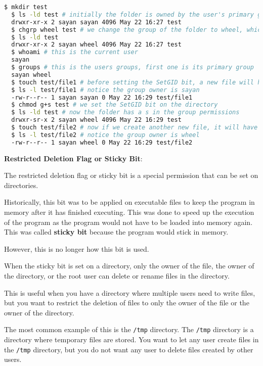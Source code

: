 \begin{lstlisting}[language=bash]
  $ mkdir test
  $ ls -ld test # initially the folder is owned by the user's primary group
  drwxr-xr-x 2 sayan sayan 4096 May 22 16:27 test
  $ chgrp wheel test # we change the group of the folder to wheel, which is a group that the user is part of
  $ ls -ld test
  drwxr-xr-x 2 sayan wheel 4096 May 22 16:27 test
  $ whoami # this is the current user
  sayan
  $ groups # this is the users groups, first one is its primary group
  sayan wheel
  $ touch test/file1 # before setting the SetGID bit, a new file will have group owner as the primary group of the user creating it
  $ ls -l test/file1 # notice the group owner is sayan
  -rw-r--r-- 1 sayan sayan 0 May 22 16:29 test/file1
  $ chmod g+s test # we set the SetGID bit on the directory
  $ ls -ld test # now the folder has a s in the group permissions
  drwxr-sr-x 2 sayan wheel 4096 May 22 16:29 test
  $ touch test/file2 # now if we create another new file, it will have the group owner as the group of the directory
  $ ls -l test/file2 # notice the group owner is wheel
  -rw-r--r-- 1 sayan wheel 0 May 22 16:29 test/file2
\end{lstlisting}

\textbf{Restricted Deletion Flag or Sticky Bit}:

The restricted deletion flag or sticky bit is a special permission that can be set on directories.

Historically, this bit was to be applied on executable files to keep the program in memory after it has finished executing.
This was done to speed up the execution of the program as the program would not have to be loaded into memory again.
This was called \textbf{sticky bit} because the program would stick in memory.

However, this is no longer how this bit is used.

When the sticky bit is set on a directory, only the owner of the file, the owner of the directory, or the root user can delete or rename files in the directory.

This is useful when you have a directory where multiple users need to write files, but you want to restrict the deletion of files to only the owner of the file or the owner of the directory.

The most common example of this is the \lstinline|/tmp| directory.
The \lstinline|/tmp| directory is a directory where temporary files are stored.
You want to let any user create files in the \lstinline|/tmp| directory, but you do not want any user to delete files created by other users.


